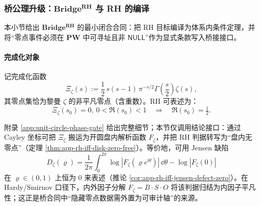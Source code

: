 \subsubsection{桥公理升级：\texorpdfstring{$\mathbf{Bridge^{RH}}$}{BridgeRH} 与 RH 的编译}\label{subsec:bridge-rh-axiom-upgrade}
本小节给出 \(\mathbf{Bridge^{RH}}\) 的最小闭合合同：把 RH 目标编译为体系内条件定理，并将“零点事件必须在 \(\mathbf{PW}\) 中可寻址且非 \(\mathsf{NULL}\)”作为显式条款写入桥接接口。

\paragraph{完成化对象}
记完成化函数
\[
\Xi_{\zeta}(s)
:=\frac12\,s(s-1)\,\pi^{-s/2}\Gamma\!\left(\frac{s}{2}\right)\zeta(s),
\]
其零点集恰为黎曼 \(\zeta\) 的非平凡零点（含重数）。RH 可表述为：
\[
\Xi_{\zeta}(s_0)=0,\ 0<\Re(s_0)<1\quad\Longrightarrow\quad \Re(s_0)=\tfrac12.
\]

\begin{remark}\label{rem:bridge-rh-disk-jensen}
附录 \ref{app:unit-circle-phase-gate} 给出完整细节；本节仅调用结论接口：通过 Cayley 坐标可把 \(\Xi_\zeta\) 搬运为开圆盘内解析函数 \(F_\zeta\)，并把 RH 判据转写为“盘内无零点”（定理 \ref{thm:app-rh-iff-disk-zero-free}）。等价地，可用 Jensen 缺陷
\[
D_{\zeta}(\varrho)
=\frac{1}{2\pi}\int_{0}^{2\pi}\log|F_{\zeta}(\varrho e^{\mathrm{i}\theta})|\,\dd\theta-\log|F_{\zeta}(0)|
\]
在 \(\varrho\in(0,1)\) 上恒为 \(0\) 来表述（推论 \ref{cor:app-rh-iff-jensen-defect-zero}）。在 Hardy/Smirnov 口径下，内外因子分解 \(F_\zeta=B\cdot S\cdot O\) 将该判据归结为内因子平凡性；这正是桥合同中“隐藏零点数据需外置为可审计轴”的来源。
\end{remark}

